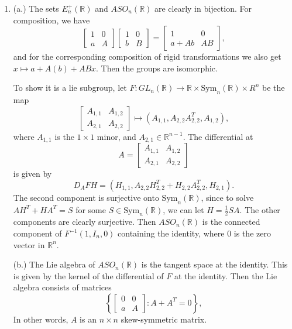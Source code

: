 \documentclass[11pt, reqno]{article}
\theoremstyle{plain}
\theoremstyle{definition}
\theoremstyle{remark}
\newcommand{\RR}{\mathbb{R}}
\begin{document}
\begin{enumerate}
    \item[4.] (a.) The sets $E^+_n(\RR)$ and $ASO_n(\RR)$ are clearly in bijection. For composition, we have
    \[
        \begin{bmatrix} 1 & 0\\ a & A\end{bmatrix}\begin{bmatrix} 1 & 0 \\ b & B\end{bmatrix} = \begin{bmatrix}1 & 0 \\ a + Ab & AB\end{bmatrix},
    \]
    and for the corresponding composition of rigid transformations we also get $x \mapsto a + A(b) + ABx$. Then the groups are isomorphic.

    To show it is a lie subgroup, let $F: GL_n(\RR) \to \RR \times \text{Sym}_n(\RR) \times R^n$ be the map 
    \[
        \begin{bmatrix}A_{1,1} & A_{1,2} \\ A_{2,1} & A_{2,2}\end{bmatrix} \mapsto (A_{1,1}, A_{2,2}A_{2,2}^T, A_{1,2}),
    \]
    where $A_{1,1}$ is the $1\times 1$ minor, and $A_{2,1} \in \RR^{n-1}$. The differential at 
    \[
        A = \begin{bmatrix}A_{1,1} & A_{1,2}\\ A_{2,1} & A_{2,2}\end{bmatrix}
    \]
    is given by
    \[
        D_A FH = (H_{1,1}, A_{2,2}H_{2,2}^T + H_{2,2}A_{2,2}^T, H_{2,1}).
    \]
    The second component is surjective onto $\text{Sym}_n(\RR)$, since to solve $AH^T + HA^T = S$ for some $S \in \text{Sym}_n(\RR)$, we 
    can let $H = \frac{1}{2}SA$. The other components are clearly surjective. Then 
    $ASO_n(\RR)$ is the connected component of $F^{-1}(1, I_n, 0)$ containing the identity, where $0$ is the zero vector in $\RR^n$. 

    (b.) The Lie algebra of $ASO_n(\RR)$ is the tangent space at the identity. This is given by the kernel of the differential of 
    $F$ at the identity. Then the Lie algebra consists of matrices 
    \[
        \left\{\begin{bmatrix}0 & 0 \\ a & A\end{bmatrix}: A + A^T = 0\right\},
    \]
    In other words, $A$ is an $n\times n$ skew-symmetric matrix. 


\end{enumerate}
\end{document}
